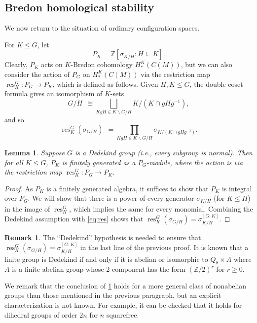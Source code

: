 \documentclass[11pt]{amsart}
\newtheorem{lemma}[equation]{Lemma}
\theoremstyle{definition}
\newtheorem{remark}[equation]{Remark}
\numberwithin{equation}{subsection} %
\def\res{\operatorname{res}}
\newcommand{\x}{\times}
\newcommand{\ints}{\cap}
\newcommand{\Z}{\mathbb{Z}}
\begin{document}
\subsection{Bredon homological stability}\label{SS:BredonStab}

We now return to the situation of ordinary configuration spaces.


For $K\leq G$, let 
\[ P_K = \Z[\sigma_{K/H} : H\subseteq K] . \]
Clearly, $P_K$ acts on $K$-Bredon cohomology $H^K_*(C(M))$, but we can also
consider the action of $P_G$ on $H^K_*(C(M))$ via the restriction
map $\res^G_K: P_G\to P_K$, which is defined as follows.
Given $H,K\leq G$, the double coset formula gives an isomorphism of
$K$-sets
$$ G/H\ \ \cong \bigsqcup_{KgH\in K\backslash G/H} K/(K\ints gHg^{-1}),$$
and so
\begin{equation}\label{eq:res}\res^G_K(\sigma_{G/H})\ \  = \prod_{KgH\in K\backslash
G/H}\sigma_{K/(K\ints gHg^{-1})}.\end{equation}

\begin{lemma} \label{lem:RK-to-RG}
Suppose $G$ is a Dedekind group (i.e., every subgroup is normal).
Then for all $K\leq G$, $P_K$ is finitely generated as a $P_G$-module, where the action is via the restriction map $\res^G_K:P_G\to P_K$.
\end{lemma}
\begin{proof}
As $P_K$ is a finitely generated algebra, it suffices to show that $P_K$ is
integral over $P_G$. We will show that there is a power of every generator
$\sigma_{K/H}$ (for $K\leq H$) in the image of $\res^G_K$, which implies the same for every
monomial. Combining the Dedekind assumption with \eqref{eq:res} shows that
$\res^G_K(\sigma_{G/H}) = \sigma_{K/H}^{[G:K]}$. 
\end{proof}

\begin{remark} \label{rmk:abelian}
The ``Dedekind'' hypothesis is needed to ensure that $\res^G_K(\sigma_{G/H}) = \sigma_{K/H}^{[G:K]}$ in the last line of the previous proof. It is known \cite{Ded97} that a finite group is Dedekind if and only if it is abelian or 
isomorphic to $Q_8\x A$ where $A$ is a finite abelian group whose 2-component 
has the form $(\Z/2)^r$
for $r\geq 0$.

We remark that the conclusion of \cref{lem:RK-to-RG} holds for a more general class of nonabelian groups than those mentioned in the previous paragraph, but an explicit characterization is not known. For example, it can be checked that it holds for dihedral groups of order $2n$ for $n$ squarefree.
\end{remark}
\end{document}
